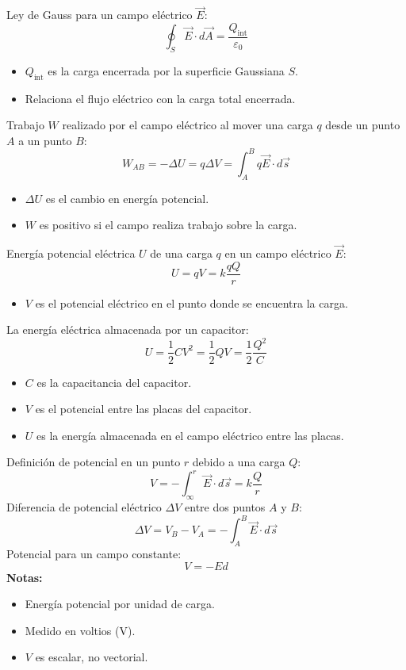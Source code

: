 \begin{tcolorbox}[title=Ley de Gauss]
  Ley de Gauss para un campo eléctrico $\vec{E}$:
  \[
    \oint_S \vec{E} \cdot d\vec{A} = \frac{Q_{\text{int}}}{\varepsilon_0}
  \]
  \begin{itemize}
    \item $Q_{\text{int}}$ es la carga encerrada por la superficie Gaussiana $S$.
    \item Relaciona el flujo eléctrico con la carga total encerrada.
  \end{itemize}  
\end{tcolorbox}

\begin{tcolorbox}[title=Trabajo Eléctrico]
  Trabajo $W$ realizado por el campo eléctrico al mover una carga $q$ desde un punto $A$ a un punto $B$:
  \[
    W_{AB} = -\Delta U = q \Delta V = \int_{A}^{B} q\vec{E} \cdot d\vec{s}
  \]
  \begin{itemize}
    \item $\Delta U$ es el cambio en energía potencial.
    \item $W$ es positivo si el campo realiza trabajo sobre la carga.
  \end{itemize}
\end{tcolorbox}
  
\begin{tcolorbox}[title=Energía Potencial]
  Energía potencial eléctrica $U$ de una carga $q$ en un campo eléctrico $\vec{E}$:
  \[
    U = qV = k\frac{qQ}{r}
  \]
  \begin{itemize}
    \item $V$ es el potencial eléctrico en el punto donde se encuentra la carga.
  \end{itemize}
  La energía eléctrica almacenada por un capacitor:
  \[
    U = \frac{1}{2} CV^2 = \frac{1}{2} QV = \frac{1}{2} \frac{Q^2}{C}
  \]
  \begin{itemize}
    \item $C$ es la capacitancia del capacitor.
    \item $V$ es el potencial entre las placas del capacitor.
    \item $U$ es la energía almacenada en el campo eléctrico entre las placas.
  \end{itemize}
\end{tcolorbox}
  
\begin{tcolorbox}[title=Potencial Eléctrico]
  Definición de potencial en un punto \(r\) debido a una carga $Q$:
  \[
    V = -\int_{\infty}^{r} \vec{E} \cdot d\vec{s} = k \frac{Q}{r}
  \]
  Diferencia de potencial eléctrico $\Delta V$ entre dos puntos $A$ y $B$:
  \[
    \Delta V = V_B - V_A = -\int_{A}^{B} \vec{E} \cdot d\vec{s}
  \]
  Potencial para un campo constante:
  \[
    V = -Ed
  \]
  \textbf{Notas:}
  \begin{itemize}
    \item Energía potencial por unidad de carga.
    \item Medido en voltios (V).
    \item $V$ es escalar, no vectorial.
  \end{itemize}
\end{tcolorbox}

